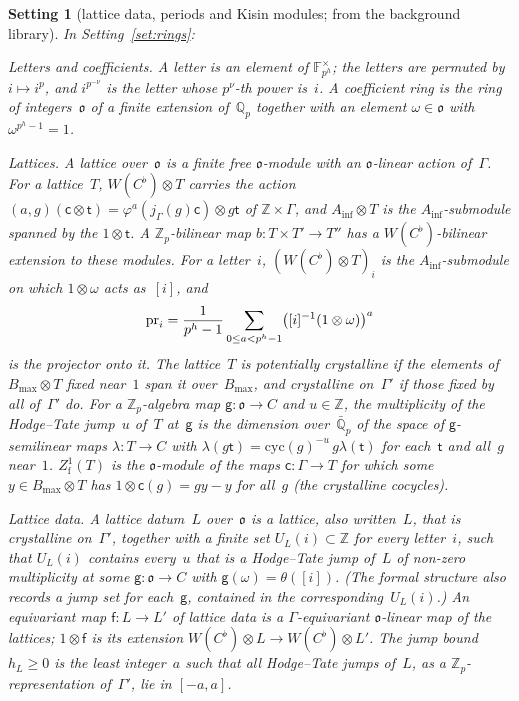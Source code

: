 \documentclass[11pt,a4paper]{article}
\newcommand{\kw}[1]{\emph{#1}}
\newcommand{\m}[1]{\mbox{$#1$}}        %
\theoremstyle{plainx}
\theoremstyle{uprightx}
\newtheorem{setting}[theorem]{Setting}          %
\providecommand{\Zp}{\mathbb{Z}_p}\providecommand{\Qp}{\mathbb{Q}_p}\providecommand{\GQp}{G_{\mathbb{Q}_p}}
\providecommand{\Ainf}{A_{\inf}}\providecommand{\WC}{W(C^{\flat})}\providecommand{\BdR}{B_{\mathrm{dR}}}
\providecommand{\fo}{\mathfrak{o}}\providecommand{\fc}{\mathfrak{c}}\providecommand{\fd}{\mathfrak{d}}
\begin{document}
\begin{setting}[lattice data, periods and Kisin modules; from the background library]\label{set:lattice}
In Setting~\ref{set:rings}:

\emph{Letters and coefficients.} A \kw{letter} is an element of \m{\mathbb{F}_{p^h}^\times}; the letters are
permuted by \m{i\mapsto i^{p}}, and \m{i^{p^{-\nu}}} is the letter whose $p^{\nu}$-th power is~$i$. A
\kw{coefficient ring} is the ring of integers~$\fo$ of a finite extension of~$\Qp$ together with an element
\m{\omega\in\fo} with \m{\omega^{p^h-1}=1}.

\emph{Lattices.} A \kw{lattice} over~$\fo$ is a finite free $\fo$-module with an $\fo$-linear action
of~$\Gamma$. For a lattice~$T$, \m{\WC\otimes T} carries the action
$(a,g)(\mathsf{c}\otimes \mathsf{t})=\varphi^{a}(j_\Gamma(g)\mathsf{c})\otimes g\mathsf{t}$ of \m{\mathbb{Z}\times\Gamma}, and \m{\Ainf\otimes T}
is the $\Ainf$-submodule spanned by the \m{1\otimes \mathsf{t}}. A $\Zp$-bilinear map \m{b\colon T\times T'\to T''} has
a $\WC$-bilinear extension to these modules. For a letter~$i$, \m{(\WC\otimes T)_i} is the $\Ainf$-submodule on
which \m{1\otimes\omega} acts as~$[i]$, and
\[\operatorname{pr}_i=\frac1{p^h-1}\sum_{0\le a<p^h-1}\bigl([i]^{-1}(1\otimes\omega)\bigr)^{a}\]
is the projector onto it. The lattice~$T$ is \kw{potentially crystalline} if the elements of
\m{B_{\max}\otimes T} fixed near~$1$ span it over~$B_{\max}$, and \kw{crystalline on~$\Gamma'$} if those fixed by
all of~$\Gamma'$ do. For a $\Zp$-algebra map \m{\mathsf{g}\colon\fo\to C} and \m{u\in\mathbb{Z}}, the
\kw{multiplicity of the Hodge--Tate jump~$u$ of~$T$ at~$\mathsf{g}$} is the dimension over~$\bar{\mathbb{Q}}_p$ of
the space of $\mathsf{g}$-semilinear maps \m{\lambda\colon T\to C} with
$\lambda(g\mathsf{t})=\mathrm{cyc}(g)^{-u}\,g\lambda(\mathsf{t})$ for each~$\mathsf{t}$ and all~$g$ near~$1$. \m{Z^{1}_{\mathrm{f}}(T)} is the
$\fo$-module of the maps \m{\mathsf{c}\colon\Gamma\to T} for which some \m{y\in B_{\max}\otimes T} has
\m{1\otimes \mathsf{c}(g)=g y-y} for all~$g$ (the crystalline cocycles).

\emph{Lattice data.} A \kw{lattice datum}~$L$ over~$\fo$ is a lattice, also written~$L$, that is crystalline
on~$\Gamma'$, together with a finite set \m{U_L(i)\subset\mathbb{Z}} for every letter~$i$, such that
\m{U_L(i)} contains every~$u$ that is a Hodge--Tate jump of~$L$ of non-zero multiplicity at some
\m{\mathsf{g}\colon\fo\to C} with \m{\mathsf{g}(\omega)=\theta([i])}. (The formal structure also records a jump set for
each~$\mathsf{g}$, contained in the corresponding~\m{U_L(i)}.) An \kw{equivariant map} \m{\mathsf{f}\colon L\to L'} of lattice
data is a $\Gamma$-equivariant $\fo$-linear map of the lattices; \m{1\otimes \mathsf{f}} is its extension
\m{\WC\otimes L\to\WC\otimes L'}. The \kw{jump bound} \m{h_L\ge0} is the least integer~$a$ such that all
Hodge--Tate jumps of~$L$, as a $\Zp$-representation of~$\Gamma'$, lie in \m{[-a,a]}.


\end{setting}
\end{document}
